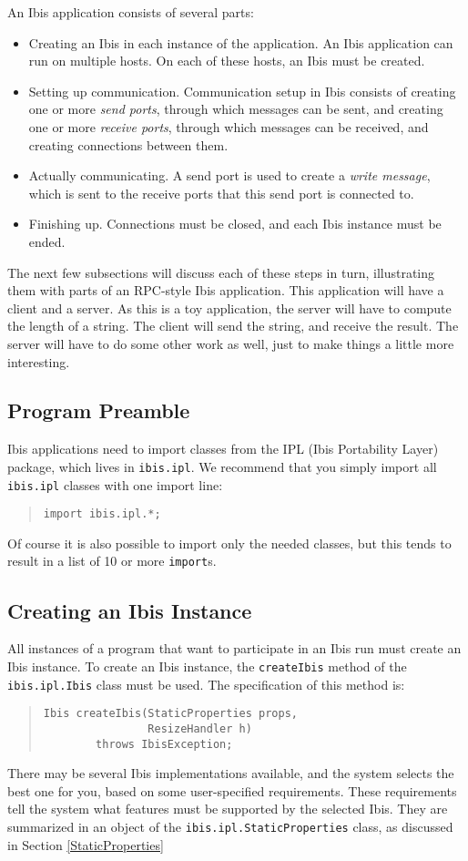 \documentclass[10pt]{article}
\newcommand{\mysubsection}[1]{\subsection{#1}\label{#1}}
\begin{document}
An Ibis application consists of several parts:
\begin{itemize}
\item
Creating an Ibis in each instance of the application.
An Ibis application can run on multiple hosts.
On each of these hosts, an Ibis must be created.
\item
Setting up communication. Communication setup in Ibis
consists of creating one or more \emph{send ports}, through which messages
can be sent, and creating one or more \emph{receive ports},
through which messages can be received, and creating connections between them.
\item
Actually communicating. A send port is used to create a 
\emph{write message}, which is sent to the receive ports that this send port
is connected to.
\item
Finishing up. Connections must be closed, and each Ibis instance must
be ended.
\end{itemize}
\noindent
The next few subsections will discuss each of these steps in turn,
illustrating them with parts of an RPC-style Ibis application.
This application will have a client and a server. As this is a toy
application, the server will have to compute the length of a string.
The client will send the string, and receive the result.
The server will have to do some other work as well, just to make
things a little more interesting.

\subsection{Program Preamble}

Ibis applications need to import classes from the IPL (Ibis
Portability Layer) package, which lives in
\verb+ibis.ipl+.
We recommend that you simply import all \texttt{ibis.ipl} classes with
one import line:
\begin{quote}
\begin{verbatim}
import ibis.ipl.*;
\end{verbatim}
\end{quote}
Of course it is also possible to import only the needed classes, but
this tends to result in a list of 10 or more \verb+import+s.

\mysubsection{Creating an Ibis Instance}

All instances of a program that want to participate in an Ibis run
must create an Ibis instance.
To create an Ibis instance, the \verb+createIbis+ method of the
\verb+ibis.ipl.Ibis+ class must be used.
The specification of this method is:
\begin{quote}
\begin{verbatim}
Ibis createIbis(StaticProperties props,
                ResizeHandler h)
        throws IbisException;
\end{verbatim}
\end{quote}
There may be several Ibis implementations available, and
the system selects the best one for you, based on some
user-specified requirements.
These requirements tell the system what features must be supported
by the selected Ibis.
They are summarized in an object of the
\verb+ibis.ipl.StaticProperties+ class, as discussed in Section
\ref{StaticProperties}
\end{document}
